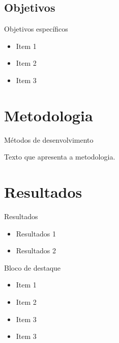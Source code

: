 \documentclass{if-beamer}
\begin{document}
\subsection{Objetivos}
\begin{frame}{Objetivos específicos}

    \begin{itemize}
        \item Item 1
        \item Item 2
        \item Item 3
    \end{itemize}

\end{frame}


\section{Metodologia}

\begin{frame}{Métodos de desenvolvimento}

    Texto que apresenta a metodologia.

\end{frame}


\section{Resultados}

\begin{frame}{Resultados}

\begin{itemize}
    \item Resultados 1
    \item Resultados 2
\end{itemize}

\begin{block}{Bloco de destaque}
    \begin{itemize}
        \item Item 1
        \item Item 2
        \item Item 3
        \item Item 3
    \end{itemize}
\end{block}

\end{frame}

\end{document}
